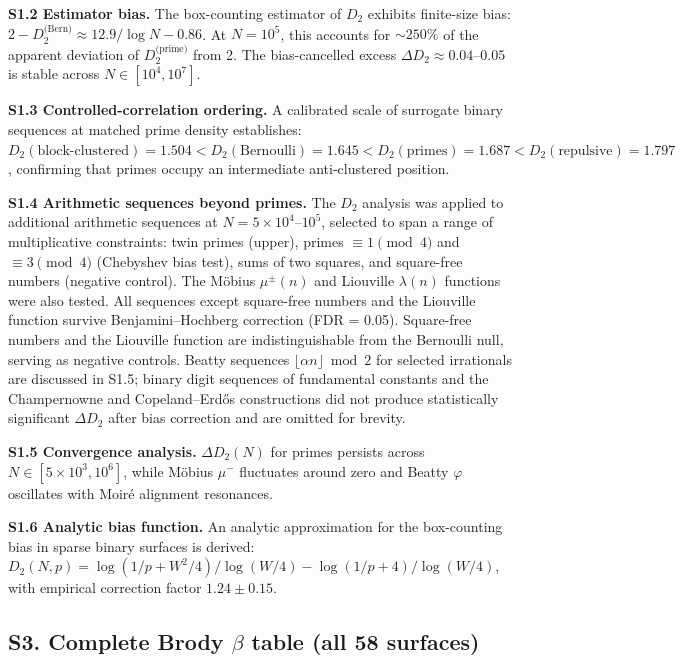 \documentclass[final,1p,times]{elsarticle}
\theoremstyle{definition}
\begin{document}
\textbf{S1.2 Estimator bias.} The box-counting estimator of $D_2$ exhibits
finite-size bias: $2 - D_2^{\text{(Bern)}} \approx 12.9/\log N - 0.86$.
At $N=10^5$, this accounts for $\sim 250\%$ of the apparent deviation
of $D_2^{\text{(prime)}}$ from 2. The bias-cancelled excess
$\Delta D_2 \approx 0.04$--$0.05$ is stable across
$N \in [10^4, 10^7]$.

\textbf{S1.3 Controlled-correlation ordering.} A calibrated scale of
surrogate binary sequences at matched prime density establishes:
$D_2(\text{block-clustered}) = 1.504 < D_2(\text{Bernoulli}) = 1.645 <
D_2(\text{primes}) = 1.687 < D_2(\text{repulsive}) = 1.797$, confirming
that primes occupy an intermediate anti-clustered position.

\textbf{S1.4 Arithmetic sequences beyond primes.} The $D_2$
analysis was applied to additional arithmetic sequences at
$N = 5\times10^4$--$10^5$, selected to span a range of
multiplicative constraints: twin primes (upper), primes
$\equiv 1 \pmod 4$ and $\equiv 3 \pmod 4$ (Chebyshev bias test),
sums of two squares, and square-free numbers (negative control).
The M\"obius $\mu^\pm(n)$ and Liouville $\lambda(n)$ functions
were also tested. All sequences except square-free numbers and
the Liouville function survive Benjamini--Hochberg correction
(FDR = 0.05). Square-free numbers and the Liouville function are
indistinguishable from the Bernoulli null, serving as negative
controls. Beatty sequences $\lfloor\alpha n\rfloor \bmod 2$ for
selected irrationals are discussed in S1.5; binary digit sequences
of fundamental constants and the Champernowne and Copeland--Erd\H{o}s
constructions did not produce statistically significant
$\Delta D_2$ after bias correction and are omitted for brevity.

\textbf{S1.5 Convergence analysis.} $\Delta D_2(N)$ for primes persists
across $N \in [5\times10^3, 10^6]$, while M\"obius $\mu^-$ fluctuates
around zero and Beatty $\varphi$ oscillates with Moir\'e alignment
resonances.

\textbf{S1.6 Analytic bias function.} An analytic approximation for the
box-counting bias in sparse binary surfaces is derived:
$D_2(N,p) = \log(1/p + W^2/4) / \log(W/4) - \log(1/p+4) / \log(W/4)$,
with empirical correction factor $1.24 \pm 0.15$.

\subsection*{S3. Complete Brody $\beta$ table (all 58 surfaces)}
\end{document}
